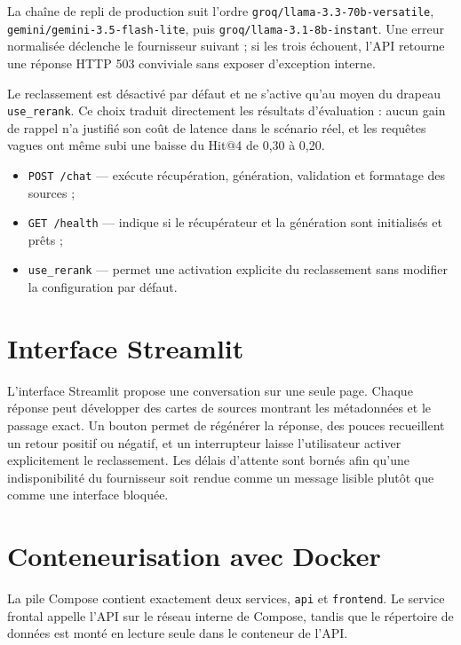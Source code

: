 La chaîne de repli de production suit l'ordre
\texttt{groq/llama-3.3-70b-versatile},
\texttt{gemini/gemini-3.5-flash-lite}, puis
\texttt{groq/llama-3.1-8b-instant}. Une erreur normalisée déclenche le fournisseur
suivant ; si les trois échouent, l'API retourne une réponse HTTP 503 conviviale
sans exposer d'exception interne.

Le reclassement est désactivé par défaut et ne s'active qu'au moyen du drapeau
\texttt{use\_rerank}. Ce choix traduit directement les résultats d'évaluation :
aucun gain de rappel n'a justifié son coût de latence dans le scénario réel, et
les requêtes vagues ont même subi une baisse du Hit@4 de 0,30 à 0,20.

\begin{encadre}
\begin{itemize}
  \item \texttt{POST /chat} — exécute récupération, génération, validation et
        formatage des sources ;
  \item \texttt{GET /health} — indique si le récupérateur et la génération sont
        initialisés et prêts ;
  \item \texttt{use\_rerank} — permet une activation explicite du reclassement
        sans modifier la configuration par défaut.
\end{itemize}
\end{encadre}

\section{Interface Streamlit}

L'interface Streamlit propose une conversation sur une seule page. Chaque réponse
peut développer des cartes de sources montrant les métadonnées et le passage exact.
Un bouton permet de régénérer la réponse, des pouces recueillent un retour positif
ou négatif, et un interrupteur laisse l'utilisateur activer explicitement le
reclassement. Les délais d'attente sont bornés afin qu'une indisponibilité du
fournisseur soit rendue comme un message lisible plutôt que comme une interface
bloquée.

\section{Conteneurisation avec Docker}

La pile Compose contient exactement deux services, \texttt{api} et
\texttt{frontend}. Le service frontal appelle l'API sur le réseau interne de
Compose, tandis que le répertoire de données est monté en lecture seule dans le
conteneur de l'API.

